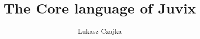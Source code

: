 \title{The Core language of Juvix}
\begin{authgrp}
\author{Lukasz Czajka}
\end{authgrp}


\releaseval{\today}
\updatedval{\today}
